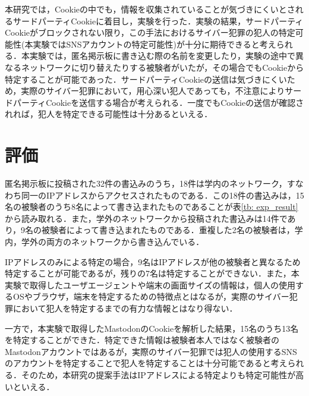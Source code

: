 \documentclass[10pt, a4paper]{jreport}
\begin{document}
本研究では，Cookieの中でも，情報を収集されていることが気づきにくいとされるサードパーティCookieに着目し，実験を行った．実験の結果，サードパーティCookieがブロックされない限り，この手法におけるサイバー犯罪の犯人の特定可能性(本実験ではSNSアカウントの特定可能性)が十分に期待できると考えられる．本実験では，匿名掲示板に書き込む際の名前を変更したり，実験の途中で異なるネットワークに切り替えたりする被験者がいたが，その場合でもCookieから特定することが可能であった．サードパーティCookieの送信は気づきにくいため，実際のサイバー犯罪において，用心深い犯人であっても，不注意によりサードパーティCookieを送信する場合が考えられる．一度でもCookieの送信が確認されれば，犯人を特定できる可能性は十分あるといえる．


\section{評価}
匿名掲示板に投稿された32件の書込みのうち，18件は学内のネットワーク，すなわち同一のIPアドレスからアクセスされたものである．この18件の書込みは，15名の被験者のうち8名によって書き込まれたものであることが表\ref{tb: exp_result}から読み取れる．また，学外のネットワークから投稿された書込みは14件であり，9名の被験者によって書き込まれたものである．重複した2名の被験者は，学内，学外の両方のネットワークから書き込んでいる．

IPアドレスのみによる特定の場合，9名はIPアドレスが他の被験者と異なるため特定することが可能であるが，残りの7名は特定することができない．また，本実験で取得したユーザエージェントや端末の画面サイズの情報は，個人の使用するOSやブラウザ，端末を特定するための特徴点とはなるが，実際のサイバー犯罪において犯人を特定するまでの有力な情報とはなり得ない．

一方で，本実験で取得したMastodonのCookieを解析した結果，15名のうち13名を特定することができた．特定できた情報は被験者本人ではなく被験者のMastodonアカウントではあるが，実際のサイバー犯罪では犯人の使用するSNSのアカウントを特定することで犯人を特定することは十分可能であると考えられる．そのため，本研究の提案手法はIPアドレスによる特定よりも特定可能性が高いといえる．
\end{document}
